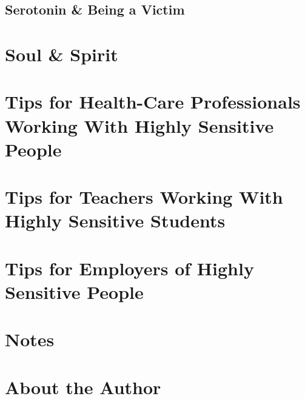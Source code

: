 \documentclass{article}
\numberwithin{equation}{section}
\begin{document}
\subsection{Serotonin \& Being a Victim}


\section{Soul \& Spirit}


\section{Tips for Health-Care Professionals Working With Highly Sensitive People}


\section{Tips for Teachers Working With Highly Sensitive Students}


\section{Tips for Employers of Highly Sensitive People}


\section{Notes}


\section{About the Author}


\printbibliography[heading=bibintoc]
	
\end{document}

